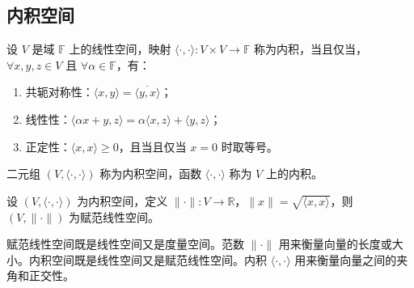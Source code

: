 \vspace{1em}

\subsection{内积空间}

\begin{definition}
    设 $ V $ 是域 $ \mathbb{F} $ 上的线性空间，映射 $ \langle\cdot,\cdot\rangle:V\times V\to \mathbb{F} $ 称为内积，当且仅当，$ \forall x,y,z\in V $ 且 $ \forall \alpha\in \mathbb{F} $，有：
    \begin{enumerate}
        \item 共轭对称性：$ \langle x,y\rangle=\overline{\langle y,x\rangle} $；
        \item 线性性：$ \langle \alpha x+y,z\rangle=\alpha\langle x,z\rangle+\langle y,z\rangle $；
        \item 正定性：$ \langle x,x\rangle\geq 0 $，且当且仅当 $ x=0 $ 时取等号。
    \end{enumerate}
    二元组 $ (V,\langle\cdot,\cdot\rangle) $ 称为内积空间，函数 $ \langle\cdot,\cdot\rangle $ 称为 $ V $ 上的内积。
\end{definition}
\vspace{1em}

\begin{proposition}[内积空间诱导的赋范线性空间]
    设 $ (V,\langle\cdot,\cdot\rangle) $ 为内积空间，定义 $ \|\cdot\|:V\to \mathbb{R} $，$ \|x\|=\sqrt{\langle x,x\rangle} $，则 $ (V,\|\cdot\|) $ 为赋范线性空间。
\end{proposition}
\vspace{1em}

\begin{note}
    赋范线性空间既是线性空间又是度量空间。范数 $ \|\cdot\| $ 用来衡量向量的长度或大小。内积空间既是线性空间又是赋范线性空间。内积 $ \langle\cdot,\cdot\rangle $ 用来衡量向量之间的夹角和正交性。
\end{note}



\newpage